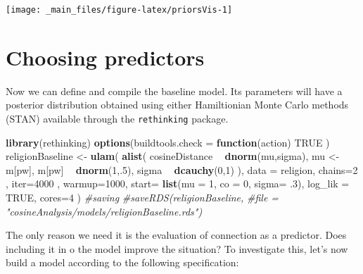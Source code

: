 \documentclass[12pt,]{book}
\newenvironment{Shaded}{\begin{snugshade}}{\end{snugshade}}
\newcommand{\KeywordTok}[1]{\textcolor[rgb]{0.13,0.29,0.53}{\textbf{#1}}}
\newcommand{\DataTypeTok}[1]{\textcolor[rgb]{0.13,0.29,0.53}{#1}}
\newcommand{\DecValTok}[1]{\textcolor[rgb]{0.00,0.00,0.81}{#1}}
\newcommand{\FloatTok}[1]{\textcolor[rgb]{0.00,0.00,0.81}{#1}}
\newcommand{\StringTok}[1]{\textcolor[rgb]{0.31,0.60,0.02}{#1}}
\newcommand{\CommentTok}[1]{\textcolor[rgb]{0.56,0.35,0.01}{\textit{#1}}}
\newcommand{\OtherTok}[1]{\textcolor[rgb]{0.56,0.35,0.01}{#1}}
\newcommand{\ControlFlowTok}[1]{\textcolor[rgb]{0.13,0.29,0.53}{\textbf{#1}}}
\newcommand{\OperatorTok}[1]{\textcolor[rgb]{0.81,0.36,0.00}{\textbf{#1}}}
\newcommand{\NormalTok}[1]{#1}
\begin{document}
\vspace{2mm}

\begin{center}\texttt{[image: \_main\_files/figure-latex/priorsVis-1]} \end{center}

\section{Choosing predictors}\label{choosing-predictors}

Now we can define and compile the baseline model. Its parameters will
have a posterior distribution obtained using either Hamiltionian Monte
Carlo methods (STAN) available through the \texttt{rethinking} package.

\vspace{1mm} \footnotesize

\begin{Shaded}
\begin{Highlighting}[]
\KeywordTok{library}\NormalTok{(rethinking)}
\KeywordTok{options}\NormalTok{(}\DataTypeTok{buildtools.check =} \ControlFlowTok{function}\NormalTok{(action) }\OtherTok{TRUE}\NormalTok{ )}
\NormalTok{religionBaseline <-}\StringTok{ }\KeywordTok{ulam}\NormalTok{(}
  \KeywordTok{alist}\NormalTok{(}
\NormalTok{    cosineDistance }\OperatorTok{~}\StringTok{ }\KeywordTok{dnorm}\NormalTok{(mu,sigma),}
\NormalTok{    mu <-}\StringTok{ }\NormalTok{m[pw],}
\NormalTok{    m[pw] }\OperatorTok{~}\StringTok{ }\KeywordTok{dnorm}\NormalTok{(}\DecValTok{1}\NormalTok{,.}\DecValTok{5}\NormalTok{),}
\NormalTok{    sigma }\OperatorTok{~}\StringTok{ }\KeywordTok{dcauchy}\NormalTok{(}\DecValTok{0}\NormalTok{,}\DecValTok{1}\NormalTok{)}
\NormalTok{  ),}
  \DataTypeTok{data =}\NormalTok{ religion,}
  \DataTypeTok{chains=}\DecValTok{2}\NormalTok{ , }\DataTypeTok{iter=}\DecValTok{4000}\NormalTok{ , }\DataTypeTok{warmup=}\DecValTok{1000}\NormalTok{,}
  \DataTypeTok{start=} \KeywordTok{list}\NormalTok{(}\DataTypeTok{mu =} \DecValTok{1}\NormalTok{, }\DataTypeTok{co =} \DecValTok{0}\NormalTok{, }\DataTypeTok{sigma=} \FloatTok{.3}\NormalTok{),}
  \DataTypeTok{log_lik =} \OtherTok{TRUE}\NormalTok{, }\DataTypeTok{cores=}\DecValTok{4}
\NormalTok{)}
\CommentTok{#saving}
\CommentTok{#saveRDS(religionBaseline, }
\CommentTok{#file = "cosineAnalysis/models/religionBaseline.rds")}
\end{Highlighting}
\end{Shaded}

\normalsize
The only reason we need it is the evaluation of connection as a
predictor. Does including it in o the model improve the situation? To
investigate this, let's now build a model according to the following
specification:
\end{document}
